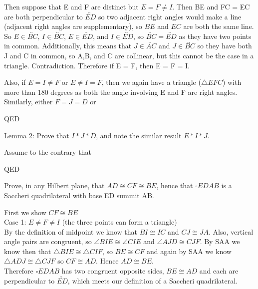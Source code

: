 \documentclass[12pt,letterpaper]{article}
\newcommand{\Proof}{\noindent {\bf Proof: }}
\newcommand{\QED}{\begin{flushright}QED\end{flushright}}
\begin{document}
Then suppose that E and F are distinct but $E = F \neq I$.  Then BE and FC = EC are both perpendicular to $\overleftrightarrow{ED}$ so two adjacent right angles would make a line (adjacent right angles are supplementary), so $BE$ and $EC$ are both the same line.  So $E \in \overleftrightarrow{BC}$, $I \in \overleftrightarrow{BC}$, $E \in \overleftrightarrow{ED}$, and $I \in \overleftrightarrow{ED}$, so $\overleftrightarrow{BC} = \overleftrightarrow{ED}$ as they have two points in common.  Additionally, this means that $J\in \overleftrightarrow{AC}$ and $J\in \overleftrightarrow{BC}$ so they have both J and C in common, so A,B, and C are collinear, but this cannot be the case in a triangle.  Contradiction.  Therefore if E = F, then E = F = I. 

Also, if $E = I \neq F$ or $E \neq I = F$, then we again have a triangle ($\triangle EFC$) with more than 180 degrees as both the angle involving E and F are right angles. Similarly, either $F=J=D$ or 


\QED	

Lemma 2: Prove that $I*J*D$, and note the similar result $E*I*J$. 

\Proof

Assume to the contrary that 


\QED


\newpage 

Prove, in any Hilbert plane, that $AD \cong CF \cong BE$, hence that $\square EDAB$ is a Saccheri quadrilateral with base ED summit AB.  \\


\Proof

First we show $CF \cong BE$\\

\noindent Case 1: $E \neq F \neq I$ (the three points can form a triangle)\\

By the definition of midpoint we know that $BI \cong IC$ and $CJ \cong JA$.  Also, vertical angle pairs are congruent, so $\angle BIE \cong \angle CIE$ and $\angle AJD \cong CJF$.  By SAA we know then that $\triangle BIE \cong \triangle CIF$, so $BE \cong CF$ and again by SAA we know $\triangle ADJ \cong \triangle CJF$ so $CF \cong AD$.  Hence $AD \cong BE$. \\

Therefore $\square EDAB$ has two congruent opposite sides, $BE \cong AD$ and each are perpendicular to $\overleftrightarrow{ED}$, which meets our definition of a Saccheri quadrilateral. \\
\end{document}
